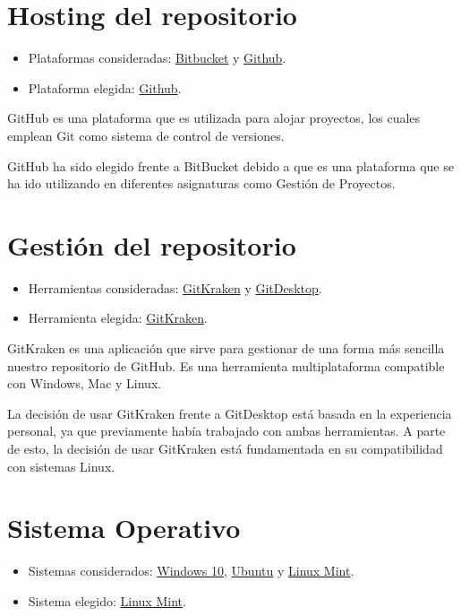 \section{Hosting del repositorio}

\begin{itemize}
	\tightlist
	\item
	Plataformas consideradas: \href{https://bitbucket.org/}{Bitbucket} y \href{https://github.com/}{Github}.
	\item
	Plataforma elegida: \href{https://github.com/}{Github}.
\end{itemize}

GitHub es una plataforma que es utilizada para alojar proyectos, los cuales emplean Git como sistema de control de versiones.

GitHub ha sido elegido frente a BitBucket debido a que es una plataforma que se ha ido utilizando en diferentes asignaturas como Gestión de Proyectos.

\section{Gestión del repositorio}

\begin{itemize}
	\tightlist
	\item
	Herramientas consideradas: \href{https://www.gitkraken.com/}{GitKraken} y \href{https://desktop.github.com/}{GitDesktop}.
	\item
	Herramienta elegida: \href{https://www.gitkraken.com/}{GitKraken}.
\end{itemize}

GitKraken es una aplicación que sirve para gestionar de una forma más sencilla nuestro repositorio de GitHub. Es una herramienta multiplataforma compatible con Windows, Mac y Linux.

La decisión de usar GitKraken frente a GitDesktop está basada en la experiencia personal, ya que previamente había trabajado con ambas herramientas. A parte de esto, la decisión de usar GitKraken está fundamentada en su compatibilidad con sistemas Linux.

\section{Sistema Operativo}

\begin{itemize}
	\tightlist
	\item
	Sistemas considerados: \href{https://www.microsoft.com/es-es/windows}{Windows 10}, \href{https://www.ubuntu.com/}{Ubuntu} y \href{https://linuxmint.com/}{Linux Mint}.
	\item
	Sistema elegido: \href{https://linuxmint.com/}{Linux Mint}.
\end{itemize}

